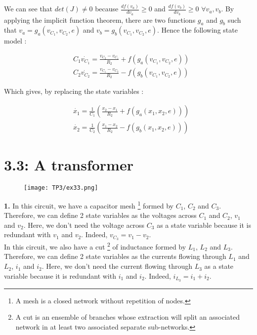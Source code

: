 We can see that $det(J) \neq 0$ because $\frac{df(v_a)}{dv_a} \geq 0$ and $\frac{df(v_b)}{dv_b} \geq 0$ $\forall v_a, v_b$. By applying the implicit function theorem, there are two functions $g_a$ and $g_b$ such that $v_a=g_a(v_{C_1},v_{C_2},e)$ and $v_b=g_b(v_{C_1},v_{C_2},e)$. Hence the following state model :

\begin{align}
&C_1\dot{v_{C_1}} = \frac{v_{C_2}-v_{C_1}}{R_2}+f(g_a(v_{C_1},v_{C_2},e))\\
&C_2\dot{v_{C_2}} = \frac{v_{C_1}-v_{C_2}}{R_2}-f(g_b(v_{C_1},v_{C_2},e))
\end{align}

Which gives, by replacing the state variables :

\begin{align}
&\dot{x_1} = \frac{1}{C_1} \left( \frac{x_2-x_1}{R_2}+f(g_a(x_1,x_2,e)) \right)\\
&\dot{x_2} = \frac{1}{C_2} \left( \frac{x_1-x_2}{R_2}-f(g_b(x_1,x_2,e)) \right)
\end{align}

\newpage

\section*{3.3: A transformer}

\begin{figure}[htbp]
\begin{center}
\texttt{[image: TP3/ex33.png]}
\end{center}
\end{figure}

\noindent \textbf{1.}
In this circuit, we have a capacitor mesh \footnote{A mesh is a closed network without repetition of nodes.} formed by $C_1$, $C_2$ and $C_3$. Therefore, we can define 2 state variables as the voltages across $C_1$ and $C_2$, $v_1$ and $v_2$. Here, we don't need the voltage across $C_3$ as a state variable because it is redundant with $v_1$ and $v_2$. Indeed, $v_{C_3} = v_1-v_2$.\\

In this circuit, we also have a cut \footnote{A cut is an ensemble of branches whose extraction will split an associated network in at least two associated separate sub-networks.} of inductance formed by $L_1$, $L_2$ and $L_3$. Therefore, we can define 2 state variables as the currents flowing through $L_1$ and $L_2$, $i_1$ and $i_2$. Here, we don't need the current flowing through $L_3$ as a state variable because it is redundant with $i_1$ and $i_2$. Indeed, $i_{L_3}=i_1+i_2$.\\

